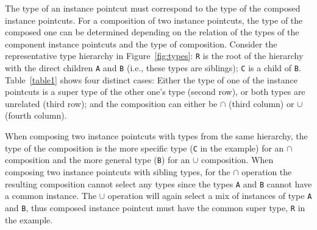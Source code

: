 \documentclass{acm_proc_article-sp}
\begin{document}
The type of an instance pointcut must correspond to the type of the composed instance pointcuts. For a composition of two instance pointcuts, the type of the composed one can be determined depending on the relation of the types of the component instance pointcuts and the type of composition. Consider the representative type hierarchy in Figure~\ref{fig:types}: \lstinline{R} is the root of the hierarchy with the direct children \lstinline{A} and \lstinline{B} (i.e., these types are siblings); \lstinline{C} is a child of \lstinline{B}. Table~\ref{table1} shows four distinct cases: Either the type of one of the instance pointcuts is a super type of the other one's type (second row), or both types are unrelated (third row); and the composition can either be $\cap$ (third column) or $\cup$ (fourth column).

When composing two instance pointcuts with types from the same hierarchy, the type of the composition is the more specific type (\lstinline{C} in the example) for an $\cap$ composition and the more general type (\lstinline{B}) for an $\cup$ composition.
When composing two instance pointcuts with sibling types, for the $\cap$ operation the resulting composition cannot select any types since the types \lstinline{A} and \lstinline{B} cannot have a common instance. The $\cup$ operation will again select a mix of instances of type \lstinline{A} and \lstinline{B}, thus composed instance pointcut must have the common super type, \lstinline{R} in the example.


\end{document}
